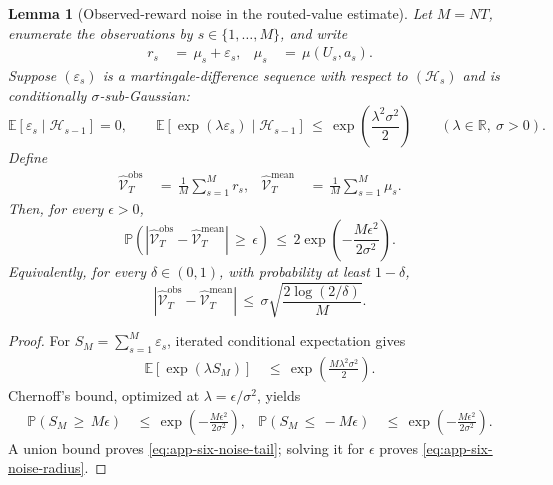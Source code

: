 \documentclass{article} %
\newtheorem{lemma}[theorem]{Lemma}
\begin{document}
\begin{lemma}[Observed-reward noise in the routed-value estimate]
\label{lem:18}
Let \(M=NT\), enumerate the observations by \(s\in\{1,\ldots,M\}\), and
write
\begin{equation}
\begin{aligned}
r_s
&\,=\,
\mu_s+\varepsilon_s,
&
\mu_s
&\,=\,
\mu(U_s,a_s).
\end{aligned}
\end{equation}
Suppose \((\varepsilon_s)\) is a martingale-difference sequence with respect
to \((\mathcal H_s)\) and is conditionally \(\sigma\)-sub-Gaussian:
\begin{equation}
\label{eq:app-six-noise-subg}
\mathbb E[\varepsilon_s\mid\mathcal H_{s-1}]=0,
\qquad
\mathbb{E}\!\left[
\exp(\lambda\varepsilon_s)
\mid
\mathcal{H}_{s-1}
\right]
\,\le\,
\exp\!\left(\frac{\lambda^2\sigma^2}{2}\right)
\qquad(\lambda\in\mathbb R,\ \sigma>0).
\end{equation}
Define
\begin{equation}
\begin{aligned}
\widehat{\mathcal{V}}_{T}^{\mathrm{obs}}
&\,=\,
\frac{1}{M}\sum_{s=1}^{M}r_s,
&
\widehat{\mathcal{V}}_{T}^{\mathrm{mean}}
&\,=\,
\frac{1}{M}\sum_{s=1}^{M}\mu_s.
\end{aligned}
\end{equation}
Then, for every \(\epsilon>0\),
\begin{equation}
\label{eq:app-six-noise-tail}
\mathbb{P}\!\left(
\left|
\widehat{\mathcal{V}}_{T}^{\mathrm{obs}}
-
\widehat{\mathcal{V}}_{T}^{\mathrm{mean}}
\right|
\,\ge\,
\epsilon
\right)
\,\le\,
2\exp\!\left(
-\frac{M\epsilon^2}{2\sigma^2}
\right).
\end{equation}
Equivalently, for every \(\delta\in(0,1)\), with probability at least
\(1-\delta\),
\begin{equation}
\label{eq:app-six-noise-radius}
\left|
\widehat{\mathcal{V}}_{T}^{\mathrm{obs}}
-
\widehat{\mathcal{V}}_{T}^{\mathrm{mean}}
\right|
\,\le\,
\sigma\sqrt{\frac{2\log(2/\delta)}{M}}.
\end{equation}
\end{lemma}

\begin{proof}
For \(S_M=\sum_{s=1}^{M}\varepsilon_s\), iterated conditional expectation
gives
\begin{equation}
\begin{aligned}
\mathbb{E}\!\left[\exp(\lambda S_M)\right]
&\,\le\,
\exp\!\left(\frac{M\lambda^2\sigma^2}{2}\right).
\end{aligned}
\end{equation}
Chernoff's bound, optimized at \(\lambda=\epsilon/\sigma^2\), yields
\begin{equation}
\begin{aligned}
\mathbb{P}(S_M\,\ge\, M\epsilon)
&\,\le\,
\exp\!\left(-\frac{M\epsilon^2}{2\sigma^2}\right),
&
\mathbb{P}(S_M\,\le\, -M\epsilon)
&\,\le\,
\exp\!\left(-\frac{M\epsilon^2}{2\sigma^2}\right).
\end{aligned}
\end{equation}
A union bound proves \eqref{eq:app-six-noise-tail}; solving it for
\(\epsilon\) proves \eqref{eq:app-six-noise-radius}.
\end{proof}
\end{document}
